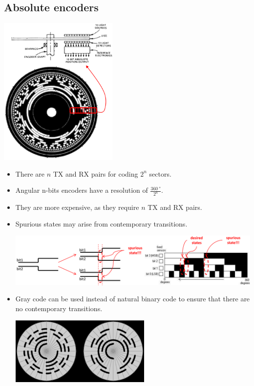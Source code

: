 \documentclass[11pt]{article}
\begin{document}
\subsection{Absolute encoders}
\label{sec:orgcfe2613}
\begin{center}
\includegraphics[height=20em]{./images/absolute-angular-n-bit-encoder.png}
\end{center}
\begin{itemize}
\item There are \(n\) TX and RX pairs for coding \(2^n\) sectors.
\item Angular n-bits encoders have a resolution of \(\frac{\qty{360}{\degree}}{2^n}\).
\item They are more expensive, as they require \(n\) TX and RX pairs.
\item Spurious states may arise from contemporary transitions.
\begin{center}
\includegraphics[width=.9\linewidth]{./images/absolute-angular-n-bit-spurious-states.png}
\end{center}
\item Gray code can be used instead of natural binary code to ensure that there are no contemporary transitions.
\begin{center}
\includegraphics[height=9em]{./images/gray-code-image.png}
\end{center}
\end{itemize}
\end{document}
